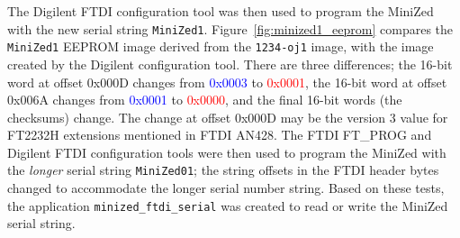 The Digilent FTDI configuration tool was then used to program the MiniZed 
with the new serial string \texttt{MiniZed1}. 
%
Figure~\ref{fig:minized1_eeprom} compares the \texttt{MiniZed1} EEPROM image 
derived from the \texttt{1234-oj1} image, with the image created by the 
Digilent configuration tool. There are three differences; the 16-bit word 
at offset 0x000D  changes from \textcolor{blue}{0x0003} to 
\textcolor{red}{0x0001}, the 16-bit word at offset 0x006A changes from 
\textcolor{blue}{0x0001} to \textcolor{red}{0x0000}, and the final 
16-bit words (the checksums) change.
%
The change at offset 0x000D may be the version 3 value for FT2232H extensions 
mentioned in FTDI AN428.
%
The FTDI FT\_PROG and Digilent FTDI configuration tools were then used to 
program the MiniZed with the \emph{longer} serial string \texttt{MiniZed01}; 
the string offsets in the FTDI header bytes changed to accommodate the 
longer serial number string. 
%
Based on these tests, the application \texttt{minized\_ftdi\_serial} was 
created to read or write the MiniZed serial string.


